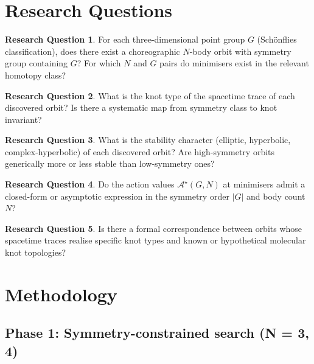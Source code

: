 \documentclass[12pt, a4paper]{article}
\theoremstyle{definition}
\newtheorem{question}{Research Question}
\newcommand{\Action}{\mathcal{A}}
\begin{document}
\section{Research Questions}

\begin{question}
For each three-dimensional point group $G$ (Sch\"onflies classification),
does there exist a choreographic $N$-body orbit with symmetry group
containing $G$? For which $N$ and $G$ pairs do minimisers exist in the
relevant homotopy class?
\end{question}

\begin{question}
What is the knot type of the spacetime trace of each discovered orbit?
Is there a systematic map from symmetry class to knot invariant?
\end{question}

\begin{question}
What is the stability character (elliptic, hyperbolic, complex-hyperbolic)
of each discovered orbit? Are high-symmetry orbits generically more or
less stable than low-symmetry ones?
\end{question}

\begin{question}
Do the action values $\Action^\star(G, N)$ at minimisers admit a
closed-form or asymptotic expression in the symmetry order $|G|$ and
body count $N$?
\end{question}

\begin{question}
Is there a formal correspondence between orbits whose spacetime traces
realise specific knot types and known or hypothetical molecular knot
topologies?
\end{question}

\section{Methodology}

\subsection{Phase 1: Symmetry-constrained search (N = 3, 4)}
\end{document}
